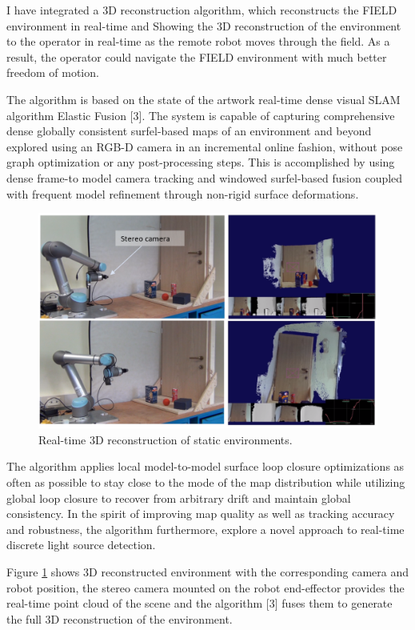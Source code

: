 I have integrated a 3D reconstruction algorithm, which reconstructs the FIELD environment in real-time and Showing the 3D reconstruction of the environment to the operator in real-time as the remote robot moves through the field. As a result, the operator could navigate the FIELD environment with much better freedom of motion.

The algorithm is based on the state of the artwork real-time dense visual SLAM algorithm Elastic Fusion [3]. The system is capable of capturing comprehensive dense globally consistent surfel-based maps of an environment and beyond explored using an RGB-D camera in an incremental online fashion, without pose graph optimization or any post-processing steps. This is accomplished by using dense frame-to model camera tracking and windowed surfel-based fusion coupled with frequent model refinement through non-rigid surface deformations.

\begin{figure}[h]
    \centering
    \includegraphics[scale=0.5]{images/Elastic_Fusion.PNG}
    \caption{Real-time 3D reconstruction of static environments.}
    \label{fig:Elastic}
\end{figure}

The algorithm applies local model-to-model surface loop closure optimizations as often as possible to stay close to the mode of the map distribution while utilizing global loop closure to recover from arbitrary drift and maintain global consistency. In the spirit of improving map quality as well as tracking accuracy and robustness, the algorithm furthermore, explore a novel approach to real-time discrete light source detection.

Figure \ref{fig:Elastic} shows 3D reconstructed environment with the corresponding camera and robot position, the stereo camera mounted on the robot end-effector provides the real-time point cloud of the scene and   the algorithm [3] fuses them to generate the full 3D reconstruction of the environment.

